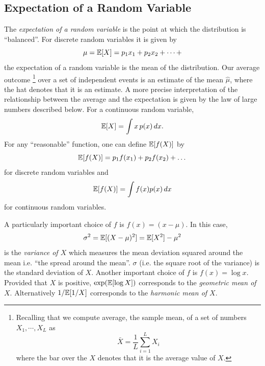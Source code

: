 \subsection*{Expectation of a Random Variable} The  \emph{expectation
  of a random variable} is the point at which the distribution is
``balanced''. For discrete random variables it is given by 
\begin{equation}
\mu = \mathbb{E}[X]=p_1x_1+p_2x_2+\dots + 
\end{equation}
the expectation of a random variable is the mean of the distribution.
Our average outcome \footnote{Recalling that we compute average, the sample mean, of a set of numbers $X_1,\cdots,X_L$ as
\begin{equation}
\bar{X} =\frac{1}{L} \sum_{i=1}^L X_i
\end{equation}
where the bar over the $X$ denotes that it is the average value of
$X$.}
over a set of independent
events is an estimate of the mean $\hat{\mu}$, where the hat denotes
that it is an estimate. A more precise interpretation of the
relationship between the average and the expectation is given by the law of large numbers described below. For a continuous random variable, 
\begin{equation}
\mathbb{E}[X]=\int x\,p(x)\,dx.
\end{equation}
For any ``reasonable'' function, one can define $\mathbb{E}[f(X)]$ by %
\begin{equation}
\mathbb{E}[f(X)]=p_1f(x_1)+p_2 f(x_2)+\dots
\end{equation}
for discrete random variables and 
\begin{equation}
\mathbb{E}[f(X)]=\int f(x)p(x)\,dx
\end{equation}
for continuous random variables. 

A particularly important choice of $f$ is $f(x)=(x-\mu)$. In this case, 
\begin{equation}
\sigma^2 = \mathbb{E}[(X-\mu)^2]= \mathbb{E}[X^2]-\mu^2
\end{equation}
is the  \emph{variance of $X$} which measures the mean deviation
squared around the mean i.e. ``the spread around the mean''. $\sigma$
(i.e. the square root of the variance) is the standard deviation of
$X$.
Another important choice of $f$ is $f(x)=\log x$. Provided that $X$ is positive, $\exp(\mathbb{E}[\log X])$ corresponds to the  \emph{geometric mean of $X$}. Alternatively $1/\mathbb{E}[1/X]$ corresponds to the \emph{harmonic mean of $X$}. 

